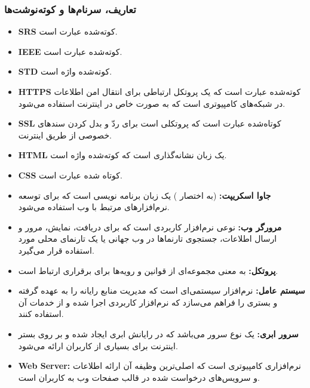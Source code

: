 \documentclass[12pt]{article}
\begin{document}
	\subsubsection{تعاریف، سرنام‌ها و کوته‌نوشت‌ها}
	\begin{itemize}
		\item
		\textbf{SRS\label{ref:srs}}
		کوته‌شده عبارت
		است.
		\item
		\textbf{IEEE\label{ref:ieee}}
		کوته‌شده عبارت
		است.
		\item
		\textbf{STD\label{ref:std}}
		کوته‌شده واژه
		است.
		\item
		\textbf{HTTPS\label{ref:https}}
		کوته‌شده عبارت
		است که یک پروتکل ارتباطی برای انتقال امن اطلاعات در شبکه‌های کامپیوتری است که به صورت خاص در اینترنت استفاده می‌شود.
		\item
		\textbf{SSL\label{ref:ssl}}
		کوتاه‌شده عبارت
		است که پروتکلی است برای ردّ و بدل کردن سندهای خصوصی از طریق اینترنت.
		\item
		\textbf{HTML\label{ref:html}}
		یک زبان نشانه‌گذاری است که کوته‌شده واژه
		است.
		\item
		\textbf{CSS\label{ref:css}}
		کوتاه شده عبارت
		است.
		\item
		\textbf{جاوا اسکریپت:\label{ref:js}}
		(به اختصار )
		یک زبان برنامه نویسی است که برای توسعه نرم‌افزارهای مرتبط با وب استفاده می‌شود.
		\item
		\textbf{مرورگر وب:\label{ref:browser}}
		نوعی نرم‌افزار کاربردی است که برای دریافت، نمایش، مرور و ارسال اطلاعات، جستجوی تارنماها در وب جهانی یا یک تارنمای محلی مورد استفاده قرار می‌گیرد.
		\item
		\textbf{پروتکل:\label{ref:protocol}}
		به معنی مجموعه‌ای از قوانین و رویه‌ها برای برقراری ارتباط است.
		\item
		\textbf{سیستم عامل:}
		نرم‌افزار سیستمی‌ای است که مدیریت منابع رایانه را به عهده گرفته و بستری را فراهم می‌سازد که نرم‌افزار کاربردی اجرا شده و از خدمات آن استفاده کنند.
		\item
		\textbf{سرور ابری:\label{ref:cs}}
		یک نوع سرور می‌باشد که در رایانش ابری ایجاد شده و بر روی بستر اینترنت برای بسیاری از کاربران ارائه می‌شود.
		\item
		\textbf{Web Server:\label{ref:ws}}
		نرم‌افزاری کامپیوتری است که اصلی‌ترین وظیفه آن ارائه اطلاعات و سرویس‌های درخواست شده در قالب صفحات وب به کاربران است.

\end{itemize}
\end{document}
